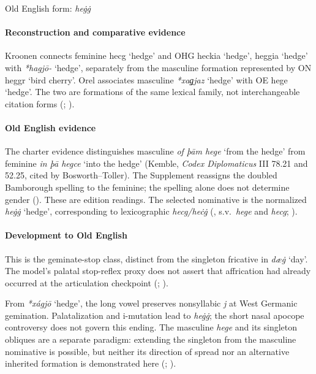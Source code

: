 \documentclass[
  british,
  a4paper,
]{article}
\providecommand{\Recon}[1]{\emph{*#1}}
\begin{document}
Old English form: \emph{heġġ}

\paragraph{Reconstruction and comparative
evidence}\label{reconstruction-and-comparative-evidence-34}

Kroonen connects feminine {hecg} `hedge' and OHG {heckia} `hedge',
{heggia} `hedge' with \Recon{hagjō-} `hedge', separately from the
masculine formation represented by ON {heggr} `bird cherry'. Orel
associates masculine \Recon{xaǥjaz} `hedge' with OE {hege} `hedge'. The
two are formations of the same lexical family, not interchangeable
citation forms (;
).

\paragraph{Old English evidence}\label{old-english-evidence-35}

The charter evidence distinguishes masculine \emph{of þām hege} `from
the hedge' from feminine \emph{in þā hegce} `into the hedge' (Kemble,
\emph{Codex Diplomaticus} III 78.21 and 52.25, cited by
Bosworth--Toller). The Supplement reassigns the doubled Bamborough
spelling to the feminine; the spelling alone does not determine gender
(). These are edition
readings. The selected nominative is the normalized \emph{heġġ} `hedge',
corresponding to lexicographic \emph{hecg/heċġ}
(,
s.v.~\emph{hege} and \emph{hecg}; ).

\paragraph{Development to Old
English}\label{development-to-old-english-35}

This is the geminate-stop class, distinct from the singleton fricative
in \emph{dæġ} `day'. The model's palatal stop-reflex proxy does not
assert that affrication had already occurred at the articulation
checkpoint (; ).

From \Recon{xágjō} `hedge', the long vowel preserves nonsyllabic
\emph{j} at West Germanic gemination. Palatalization and i-mutation lead
to \emph{heġġ}; the short nasal apocope controversy does not govern this
ending. The masculine \emph{hege} and its singleton obliques are a
separate paradigm: extending the singleton from the masculine nominative
is possible, but neither its direction of spread nor an alternative
inherited formation is demonstrated here (; ).
\end{document}

